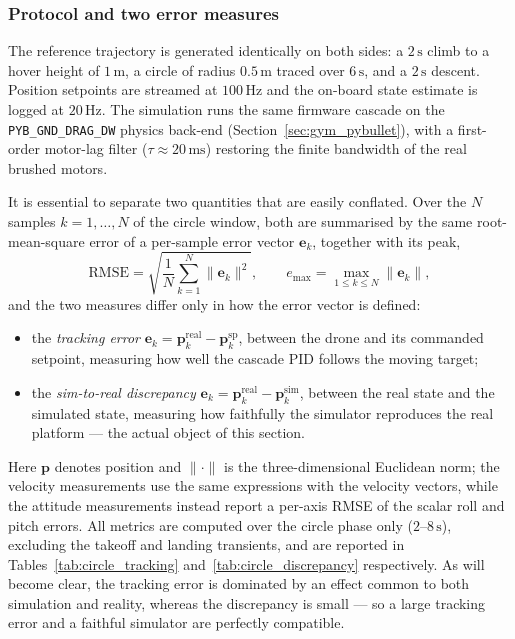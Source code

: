 \documentclass[11pt,a4paper]{article}
\theoremstyle{remark}
\numberwithin{equation}{section}
\begin{document}
\subsubsection*{Protocol and two error measures}

The reference trajectory is generated identically on both sides: a
$2\,\mathrm{s}$ climb to a hover height of $1\,\mathrm{m}$, a
circle of radius $0.5\,\mathrm{m}$ traced over $6\,\mathrm{s}$, and a
$2\,\mathrm{s}$ descent. Position setpoints are streamed at $100\,\mathrm{Hz}$
and the on-board state estimate is logged at $20\,\mathrm{Hz}$. The simulation
runs the same firmware cascade on the \texttt{PYB\_GND\_DRAG\_DW} physics
back-end (Section~\ref{sec:gym_pybullet}), with a first-order motor-lag filter
($\tau \approx 20\,\mathrm{ms}$) restoring the finite bandwidth of the real
brushed motors.

It is essential to separate two quantities that are easily conflated. Over the
$N$ samples $k=1,\dots,N$ of the circle window, both are summarised by the same
root-mean-square error of a per-sample error vector $\mathbf{e}_k$, together with
its peak,
\begin{equation}
    \mathrm{RMSE} = \sqrt{\frac{1}{N}\sum_{k=1}^{N}\lVert \mathbf{e}_k\rVert^2},
    \qquad
    e_{\max} = \max_{1\le k\le N}\lVert \mathbf{e}_k\rVert,
    \label{eq:circle_rmse}
\end{equation}
and the two measures differ only in how the error vector is defined:
\begin{itemize}
    \item the \emph{tracking error}
    $\mathbf{e}_k = \mathbf{p}_k^{\mathrm{real}} - \mathbf{p}_k^{\mathrm{sp}}$,
    between the drone and its commanded setpoint, measuring how well the cascade
    PID follows the moving target;
    \item the \emph{sim-to-real discrepancy}
    $\mathbf{e}_k = \mathbf{p}_k^{\mathrm{real}} - \mathbf{p}_k^{\mathrm{sim}}$,
    between the real state and the simulated state, measuring how faithfully the
    simulator reproduces the real platform --- the actual object of this section.
\end{itemize}
Here $\mathbf{p}$ denotes position and $\lVert\cdot\rVert$ is the
three-dimensional Euclidean norm; the velocity measurements use the same expressions
with the velocity vectors, while the attitude measurements instead report a per-axis
RMSE of the scalar roll and pitch errors. All metrics are computed over the circle phase only
($2$--$8\,\mathrm{s}$), excluding the takeoff and landing transients, and are
reported in Tables~\ref{tab:circle_tracking} and~\ref{tab:circle_discrepancy}
respectively. As will become clear, the tracking error is dominated by an effect
common to both simulation and reality, whereas the discrepancy is small --- so a
large tracking error and a faithful simulator are perfectly compatible.
\end{document}
